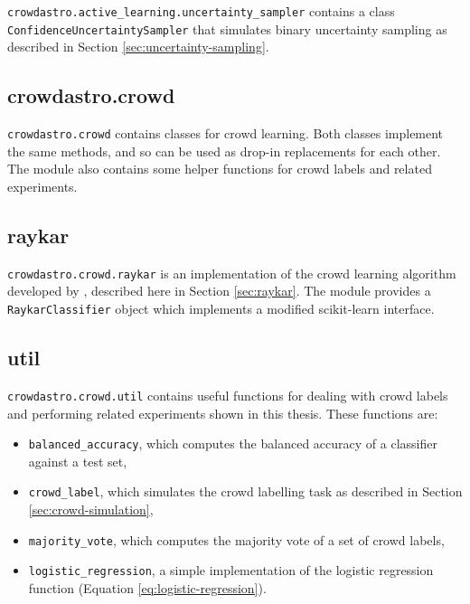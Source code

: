             \texttt{crowdastro.active\_learning.uncertainty\_sampler} contains a
            class \texttt{ConfidenceUncertaintySampler} that simulates binary
            uncertainty sampling as described in Section
            \ref{sec:uncertainty-sampling}.

    \subsection{crowdastro.crowd}
    \label{sec:crowdastro-crowd}

        \texttt{crowdastro.crowd} contains classes for crowd learning. Both
        classes implement the same methods, and so can be used as drop-in
        replacements for each other. The module also contains some helper
        functions for crowd labels and related experiments.

        \subsection{raykar}
            \label{sec:crowdastro-raykar}

            \texttt{crowdastro.crowd.raykar} is an implementation of the crowd
            learning algorithm developed by \citet{raykar10}, described here in
            Section \ref{sec:raykar}. The module provides a
            \texttt{RaykarClassifier} object which implements a modified
            scikit-learn interface.

        \subsection{util}
            \label{sec:crowdastro-util}

            \texttt{crowdastro.crowd.util} contains useful functions for dealing
            with crowd labels and performing related experiments shown in this
            thesis. These functions are:
            \begin{itemize}
                \item \texttt{balanced\_accuracy}, which computes the balanced
                    accuracy of a classifier against a test set,
                \item \texttt{crowd\_label}, which simulates the crowd labelling
                    task as described in Section \ref{sec:crowd-simulation},
                \item \texttt{majority\_vote}, which computes the majority vote
                    of a set of crowd labels,
                \item \texttt{logistic\_regression}, a simple implementation of
                    the logistic regression function (Equation
                    \ref{eq:logistic-regression}).
            \end{itemize}

